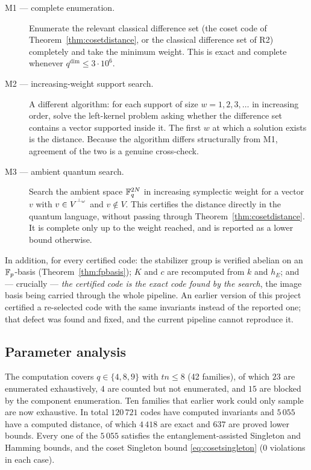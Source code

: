 \begin{description}
\item[M1 --- complete enumeration.] Enumerate the relevant classical difference
  set (the coset code of Theorem~\ref{thm:cosetdistance}, or the classical
  difference set of R2) completely and take the minimum weight. This is exact
  and complete whenever $q^{\dim}\le3\cdot10^6$.
\item[M2 --- increasing-weight support search.] A different algorithm: for each
  support of size $w=1,2,3,\dots$ in increasing order, solve the left-kernel
  problem asking whether the difference set contains a vector supported inside
  it. The first $w$ at which a solution exists is the distance. Because the
  algorithm differs structurally from M1, agreement of the two is a genuine
  cross-check.
\item[M3 --- ambient quantum search.] Search the ambient space
  $\mathbb F_q^{2N}$ in increasing symplectic weight for a vector $v$ with
  $v\in V^{{}^{\perp_\omega}}$ and $v\notin V$. This certifies the distance directly in
  the quantum language, without passing through
  Theorem~\ref{thm:cosetdistance}. It is complete only up to the weight reached,
  and is reported as a lower bound otherwise.
\end{description}

In addition, for every certified code: the stabilizer group is verified abelian
on an $\mathbb F_p$-basis (Theorem~\ref{thm:fpbasis}); $K$ and $c$ are recomputed from
$k$ and $h_E$; and --- crucially --- \emph{the certified code is the exact code
found by the search}, the image basis being carried through the whole pipeline.
An earlier version of this project certified a re-selected code with the same
invariants instead of the reported one; that defect was found and fixed, and the
current pipeline cannot reproduce it.

\subsection{Parameter analysis}

The computation covers $q\in\{4,8,9\}$ with $tn\le8$ (42 families), of which
$23$ are enumerated exhaustively, $4$ are counted but not enumerated, and $15$
are blocked by the component enumeration. Ten families that earlier work could
only sample are now exhaustive. In total $120\,721$ codes have computed
invariants and $5\,055$ have a computed distance, of which $4\,418$ are exact
and $637$ are proved lower bounds. Every one of the $5\,055$ satisfies the
entanglement-assisted Singleton and Hamming bounds, and the coset Singleton
bound \eqref{eq:cosetsingleton} (0 violations in each case).

